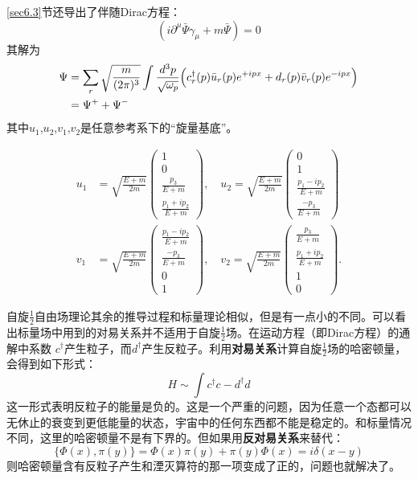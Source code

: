 \ref{sec6.3}节还导出了伴随Dirac方程：
$$(i\partial^{\mu}\bar{\Psi} \gamma_{\mu}+m\bar{\Psi})=0$$
其解为
\begin{align} 
	\Psi &= \sum_{r} \sqrt{\frac{m}{(2\pi)^{3}}}\int \frac{d^{3}p}{\sqrt{\omega_{p}} } \Big( c^{\dagger}_{r}(p) \bar{u}_{r}(p)e^{+ipx}+d_{r}(p) \bar{v}_{r}(p) e^{-ipx} \Big) \label{equ9.35}  \\
	&= \Psi^{+} + \Psi^{-} \notag  
\end{align}
其中$u_{1}$,$u_{2}$,$v_{1}$,$v_{2}$是任意参考系下的“旋量基底”。

\begin{align}
    u_1 &= \sqrt{ \frac{E + m}{2m} }
        \begin{pmatrix}
            1 \\ 0 \\ \frac{p_3}{E + m} \\ \frac{p_1 + i p_2}{E + m}
        \end{pmatrix}, \quad
    u_2 = \sqrt{ \frac{E + m}{2m} }
        \begin{pmatrix}
            0 \\ 1 \\ \frac{p_1 - ip_2}{E + m} \\ \frac{-p_3}{E + m}
        \end{pmatrix}  \label{equ9.36} \\
    v_1 &= \sqrt{ \frac{E + m}{2m} }
        \begin{pmatrix}
            \frac{p_1 - ip_2}{E + m} \\ \frac{-p_3}{E + m} \\ 0 \\ 1
        \end{pmatrix}, \quad
    v_2 = \sqrt{ \frac{E + m}{2m} }
        \begin{pmatrix}
            \frac{p_3}{E + m} \\ \frac{p_1 + ip_2}{E + m} \\ 1 \\ 0
        \end{pmatrix}. \label{equ9.37}
\end{align}

自旋$\frac{1}{2}$自由场理论其余的推导过程和标量理论相似，但是有一点小的不同。可以看出标量场中用到的对易关系并不适用于自旋$\frac{1}{2}$场。在运动方程（即Dirac方程）的通解中系数 $c^{\dagger}$产生粒子，而$d^{\dagger}$产生反粒子。利用{\bf 对易关系}计算自旋$\frac{1}{2}$场的哈密顿量，会得到如下形式：
$$H\sim \int c^{\dagger}c-d^{\dagger}d$$
这一形式表明反粒子的能量是负的。这是一个严重的问题，因为任意一个态都可以无休止的衰变到更低能量的状态，宇宙中的任何东西都不能是稳定的。和标量情况不同，这里的哈密顿量不是有下界的。但如果用{\bf 反对易关系}来替代：
$$\{ \Phi(x), \pi(y) \}=\Phi(x)\pi(y)+\pi(y)\Phi(x)=i\delta(x-y)$$
则哈密顿量含有反粒子产生和湮灭算符的那一项变成了正的，问题也就解决了。

